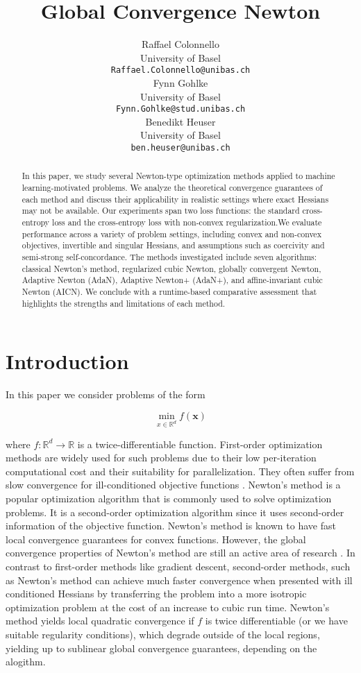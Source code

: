\documentclass{article}
\title{Global Convergence Newton}
\author{
  Raffael Colonnello\\
  University of Basel\\
  \texttt{Raffael.Colonnello@unibas.ch} \\
  \And
  Fynn Gohlke\\
  University of Basel\\
  \texttt{Fynn.Gohlke@stud.unibas.ch} \\
  \AND
  Benedikt Heuser\\
  University of Basel\\
  \texttt{ben.heuser@unibas.ch} \\
}
\begin{document}
\maketitle


\begin{abstract}
  In this paper, we study several Newton-type optimization methods applied to machine learning-motivated problems. We analyze the theoretical convergence guarantees of each method and discuss their applicability in realistic settings where exact Hessians may not be available. Our experiments span two loss functions: the standard cross-entropy loss and the cross-entropy loss with non-convex regularization.We evaluate performance across a variety of problem settings, including convex and non-convex objectives, invertible and singular Hessians, and assumptions such as coercivity and semi-strong self-concordance. The methods investigated include seven algorithms: classical Newton's method, regularized cubic Newton, globally convergent Newton, Adaptive Newton (AdaN), Adaptive Newton+ (AdaN+), and affine-invariant cubic Newton (AICN). We conclude with a runtime-based comparative assessment that highlights the strengths and limitations of each method.
\end{abstract}

\section{Introduction}
In this paper we consider problems of the form

\begin{equation}
  \min_{x \in \mathbb{R}^d} f(\mathbf{x})
\end{equation}

where $f: \mathbb{R}^d \rightarrow \mathbb{R}$ is a twice-differentiable function. First-order optimization methods are widely used for such problems due to their low per-iteration computational cost and their suitability for parallelization. They often suffer from slow convergence for ill-conditioned objective functions \cite{wright}.
Newton's method is a popular optimization algorithm that is commonly used to solve optimization
problems. It is a second-order optimization algorithm since it uses second-order information of the
objective function. Newton's method is known to have fast local convergence guarantees for convex
functions. However, the global convergence properties of Newton's method are still an active area of
research \cite{mishchenko2023regularized} \cite{hanzely2022damped}. In contrast to first-order methods like gradient descent, second-order methods, such as Newton's method can achieve much faster convergence when presented with ill conditioned Hessians by transferring the problem into a more isotropic optimization problem at the cost of an increase to cubic run time. Newton's method yields local quadratic convergence if $f$ is twice differentiable (or we have suitable regularity conditions), which degrade outside of the local regions, yielding up to sublinear global convergence guarantees, depending on the alogithm.
\end{document}
